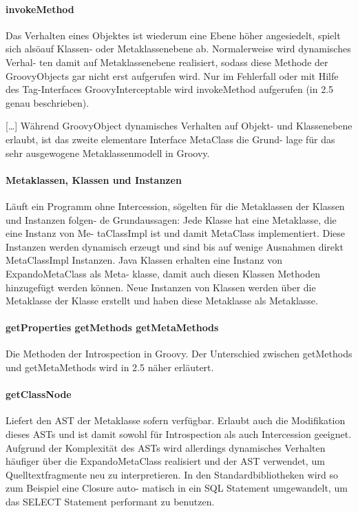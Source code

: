\documentclass[11pt,english,ngerman, headsepline]{scrreprt}
\begin{document}
\paragraph{ invokeMethod } Das Verhalten eines Objektes ist wiederum eine Ebene
höher angesiedelt, spielt sich alsöauf Klassen- oder Metaklassenebene ab.
Normalerweise wird dynamisches Verhal- ten damit auf Metaklassenebene
realisiert, sodass diese Methode der GroovyObjects gar nicht erst aufgerufen
wird. Nur im Fehlerfall oder mit Hilfe des Tag-Interfaces GroovyInterceptable
wird invokeMethod aufgerufen (in 2.5 genau beschrieben).

[\ldots] Während GroovyObject dynamisches Verhalten auf Objekt- und
Klassenebene erlaubt, ist das zweite elementare Interface MetaClass die Grund-
lage für das sehr ausgewogene Metaklassenmodell in Groovy.

\paragraph{ Metaklassen, Klassen und Instanzen} Läuft ein Programm ohne
Intercession, sögelten für die Metaklassen der Klassen und Instanzen folgen- de
Grundaussagen: Jede Klasse hat eine Metaklasse, die eine Instanz von Me-
taClassImpl ist und damit MetaClass implementiert. Diese Instanzen werden
dynamisch erzeugt und sind bis auf wenige Ausnahmen direkt MetaClassImpl
Instanzen. Java Klassen erhalten eine Instanz von ExpandoMetaClass als Meta-
klasse, damit auch diesen Klassen Methoden hinzugefügt werden können. Neue
Instanzen von Klassen werden über die Metaklasse der Klasse erstellt und haben
diese Metaklasse als Metaklasse.




 
\paragraph{ getProperties getMethods getMetaMethods}
Die Methoden der Introspection in Groovy. Der Unterschied zwischen getMethods
und getMetaMethods wird in 2.5 näher erläutert.
\paragraph{ getClassNode}
Liefert den AST der Metaklasse sofern verfügbar. Erlaubt auch die Modifikation
dieses ASTs und ist damit sowohl für Introspection als auch Intercession
geeignet. Aufgrund der Komplexität des ASTs wird allerdings dynamisches
Verhalten häufiger über die ExpandoMetaClass realisiert und der AST verwendet,
um Quelltextfragmente neu zu interpretieren. In den Standardbibliotheken wird so
zum Beispiel eine Closure auto- matisch in ein SQL Statement umgewandelt, um das
SELECT Statement performant zu benutzen.
\end{document}
